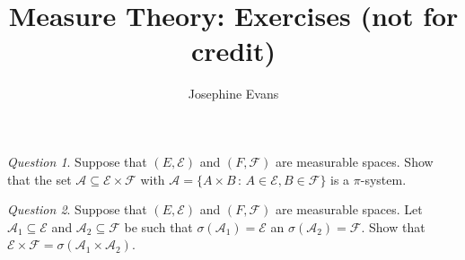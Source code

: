\documentclass[11pt]{article}
\author{
Josephine Evans
}
\title{Measure Theory: Exercises (not for credit)}
\theoremstyle{definition}
\theoremstyle{remark}
\newtheorem{q}{Question}
\newenvironment{ans}{\paragraph{Answer:}}{\hfill$\square$\vspace{10pt}}
\begin{document}
\maketitle

\begin{q}
Suppose that $(E, \mathcal{E})$ and $(F, \mathcal{F})$ are measurable spaces. Show that the set $\mathcal{A} \subseteq \mathcal{E} \times \mathcal{F}$ with $\mathcal{A} = \{ A \times B \,:\, A \in \mathcal{E}, B \in \mathcal{F}\}$ is a $\pi$-system. 
\end{q}

\begin{q}
Suppose that $(E, \mathcal{E})$ and $(F, \mathcal{F})$ are measurable spaces. Let $\mathcal{A}_1 \subseteq \mathcal{E}$ and $\mathcal{A}_2 \subseteq \mathcal{F}$ be such that $\sigma(\mathcal{A}_1) = \mathcal{E}$ an $\sigma(\mathcal{A}_2) = \mathcal{F}$. Show that $\mathcal{E}\times \mathcal{F} = \sigma(\mathcal{A}_1 \times \mathcal{A}_2)$.
\end{q}
\end{document}
